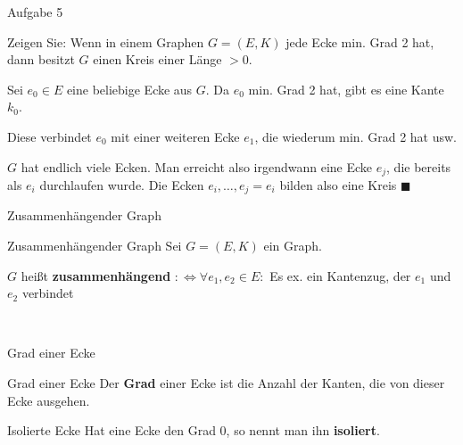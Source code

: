 \begin{frame}{Aufgabe 5}
\begin{block}{Zeigen Sie: }
Wenn in einem Graphen $G=(E,K)$ jede Ecke min. Grad 2 hat, dann 
besitzt $G$ einen Kreis einer Länge $>0$.
\end{block}

\pause

Sei $e_0 \in E$ eine beliebige Ecke aus $G$. Da $e_0$ min. Grad 2 hat,
gibt es eine Kante $k_0$.

\pause

Diese verbindet $e_0$ mit einer weiteren Ecke $e_1$, die wiederum
min. Grad 2 hat usw.

\pause

$G$ hat endlich viele Ecken. Man erreicht also irgendwann eine
Ecke $e_j$, die bereits als $e_i$ durchlaufen wurde. Die Ecken
$e_i, \dots, e_j = e_i$ bilden also eine Kreis $\blacksquare$
\end{frame}

\begin{frame}{Zusammenhängender Graph}
\begin{block}{Zusammenhängender Graph}
Sei $G = (E, K)$ ein Graph.

$G$ heißt \textbf{zusammenhängend} $:\Leftrightarrow \forall e_1, e_2 \in E: $ 
Es ex. ein Kantenzug, der $e_1$ und $e_2$ verbindet
\end{block}

\begin{gallery}
    \\
\end{gallery}
\end{frame}

\begin{frame}{Grad einer Ecke}
\begin{block}{Grad einer Ecke}
Der \textbf{Grad} einer Ecke ist die Anzahl der Kanten, die von dieser Ecke
ausgehen.
\end{block}

\begin{block}{Isolierte Ecke}
Hat eine Ecke den Grad 0, so nennt man ihn \textbf{isoliert}.
\end{block}

\begin{gallery}
    \\
\end{gallery}
\end{frame}
